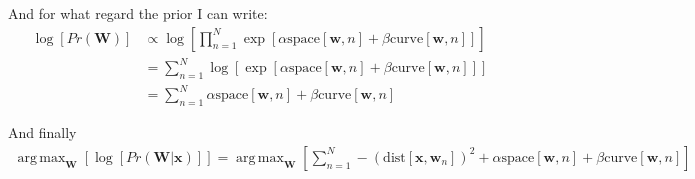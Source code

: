 \documentclass[a4paper,12pt]{article}
\DeclareMathOperator*{\argmax}{arg\,max}
\begin{document}
And for what regard the prior I can write:
\begin{equation}
\begin{split}
\log{[Pr(\mathbf{W})]} & \propto \log{[\prod_{n=1}^N \exp{[\alpha \text{space}[\mathbf{w},n]+\beta \text{curve}[\mathbf{w},n]]}]} \\
& = \sum_{n=1}^N \log{[\exp{[\alpha \text{space}[\mathbf{w},n]+\beta \text{curve}[\mathbf{w},n]]}]} \\
& = \sum_{n=1}^N \alpha \text{space}[\mathbf{w},n]+\beta \text{curve}[\mathbf{w},n]
\end{split}
\end{equation}

And finally
\begin{equation}
\begin{split}
\argmax_{\mathbf{W}}[\log{[Pr(\mathbf{W}\vert\mathbf{x})]}] = \argmax_{\mathbf{W}}[\sum_{n=1}^N -(\text{dist}[\mathbf{x},\mathbf{w}_n])^2+\alpha \text{space}[\mathbf{w},n]+\beta \text{curve}[\mathbf{w},n]]\\
\end{split}
\end{equation}
\end{document}
